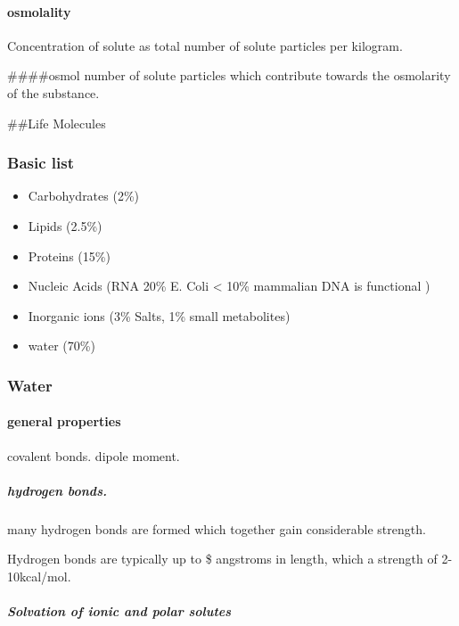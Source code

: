 \documentclass[]{article}
\providecommand{\tightlist}{%
  \setlength{\itemsep}{0pt}\setlength{\parskip}{0pt}}
\let\oldparagraph\paragraph
\renewcommand{\paragraph}[1]{\oldparagraph{#1}\mbox{}}
\let\oldsubparagraph\subparagraph
\renewcommand{\subparagraph}[1]{\oldsubparagraph{#1}\mbox{}}
\begin{document}
\hypertarget{osmolality}{%
\paragraph{osmolality}\label{osmolality}}

Concentration of solute as total number of solute particles per
kilogram.

\#\#\#\#osmol number of solute particles which contribute towards the
osmolarity of the substance.

\#\#Life Molecules

\hypertarget{basic-list}{%
\subsubsection{Basic list}\label{basic-list}}

\begin{itemize}
\tightlist
\item
  Carbohydrates (2\%)
\item
  Lipids (2.5\%)
\item
  Proteins (15\%)
\item
  Nucleic Acids (RNA 20\% E. Coli \textless{} 10\% mammalian DNA is
  functional )
\item
  Inorganic ions (3\% Salts, 1\% small metabolites)
\item
  water (70\%)
\end{itemize}

\hypertarget{water}{%
\subsubsection{Water}\label{water}}

\hypertarget{general-properties}{%
\paragraph{general properties}\label{general-properties}}

covalent bonds. dipole moment.

\hypertarget{hydrogen-bonds.}{%
\subparagraph{hydrogen bonds.}\label{hydrogen-bonds.}}

many hydrogen bonds are formed which together gain considerable
strength.

Hydrogen bonds are typically up to \$ angstroms in length, which a
strength of 2-10kcal/mol.

\hypertarget{solvation-of-ionic-and-polar-solutes}{%
\subparagraph{Solvation of ionic and polar
solutes}\label{solvation-of-ionic-and-polar-solutes}}
\end{document}
